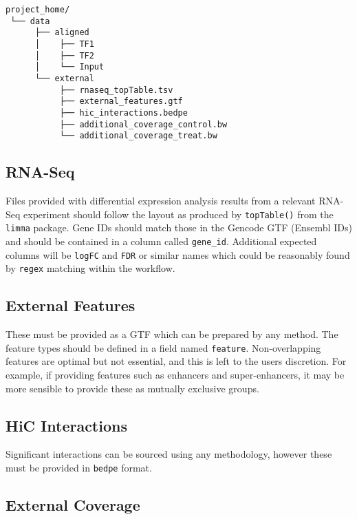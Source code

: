 \documentclass[
]{book}
\begin{document}
\begin{verbatim}
project_home/
 └── data
      ├── aligned 
      │    ├── TF1 
      │    ├── TF2 
      │    └── Input
      └── external
           ├── rnaseq_topTable.tsv
           ├── external_features.gtf
           ├── hic_interactions.bedpe
           ├── additional_coverage_control.bw
           └── additional_coverage_treat.bw
\end{verbatim}

\hypertarget{rna-seq}{%
\subsection{RNA-Seq}\label{rna-seq}}

Files provided with differential expression analysis results from a relevant RNA-Seq experiment should follow the layout as produced by \texttt{topTable()} from the \texttt{limma} package\citep{limma}.
Gene IDs should match those in the Gencode GTF (Ensembl IDs) and should be contained in a column called \texttt{gene\_id}.
Additional expected columns will be \texttt{logFC} and \texttt{FDR} or similar names which could be reasonably found by \texttt{regex} matching within the workflow.

\hypertarget{external-features}{%
\subsection{External Features}\label{external-features}}

These must be provided as a GTF which can be prepared by any method.
The feature types should be defined in a field named \texttt{feature}.
Non-overlapping features are optimal but not essential, and this is left to the users discretion.
For example, if providing features such as enhancers and super-enhancers\citep{rose}, it may be more sensible to provide these as mutually exclusive groups.

\hypertarget{hic-interactions}{%
\subsection{HiC Interactions}\label{hic-interactions}}

Significant interactions can be sourced using any methodology, however these must be provided in \texttt{bedpe} format.

\hypertarget{external-coverage}{%
\subsection{External Coverage}\label{external-coverage}}
\end{document}
